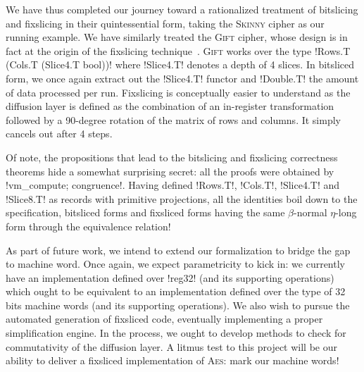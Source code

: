 \documentclass[draft,english]{jflart}
\newcommand{\Skinny}{\textsc{Skinny}}
\newcommand{\Gift}{\textsc{Gift}}
\newcommand{\AES}{\textsc{Aes}}
\begin{document}
We have thus completed our journey toward a rationalized treatment of
bitslicing and fixslicing in their quintessential form, taking the
\Skinny{} cipher as our running example.
%
%
We have similarly treated the \Gift{} cipher, whose design is in fact at
the origin of the fixslicing
technique~\citep{adominicai:fixslicing-gift}. \Gift{} works over the type
%
\coqe!Rows.T (Cols.T (Slice4.T bool))!
%
where \coqe!Slice4.T! denotes a depth of 4 slices. In bitsliced form,
we once again extract out the \coqe!Slice4.T! functor and
\coqe!Double.T! the amount of data processed per run. Fixslicing is
conceptually easier to understand as the diffusion layer is defined as
the combination of an in-register transformation followed by a
90-degree rotation of the matrix of rows and columns. It simply
cancels out after 4 steps.


Of note, the propositions that lead to the bitslicing and fixslicing
correctness theorems hide a somewhat surprising secret: all the proofs
were obtained by \coqe!vm_compute; congruence!. Having defined
\coqe!Rows.T!, \coqe!Cols.T!, \coqe!Slice4.T! and \coqe!Slice8.T! as
records with primitive projections, all the identities boil down to
the specification, bitsliced forms and fixsliced forms having the
same $\beta$-normal $\eta$-long form through the equivalence
relation!



As part of future work, we intend to extend our formalization to
bridge the gap to machine word. Once again, we expect parametricity to
kick in: we currently have an implementation defined over \coqe!reg32!
(and its supporting operations) which ought to be equivalent to an
implementation defined over the type of 32 bits machine words (and its
supporting operations).
%
We also wish to pursue the automated generation of fixsliced code,
eventually implementing a proper simplification engine. In the
process, we ought to develop methods to check for commutativity of the
diffusion layer.
%
A litmus test to this project will be our ability to deliver a
fixsliced implementation of \AES{}: mark our machine words!

\clearpage



\end{document}
